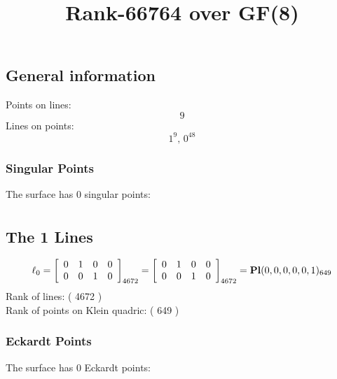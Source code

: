 \documentclass{article}
\newcommand\setTBstruts{\def\T{\rule{0pt}{2.6ex}}%
\def\B{\rule[-1.2ex]{0pt}{0pt}}}
\begin{document}
 
\setTBstruts



{\allowdisplaybreaks%






\title{Rank-66764 over GF(8)}
\author{}%
\maketitle%
%
{}



\subsection*{General information}
Points on lines:
$$
9$$
Lines on points:
$$
1^9,\,0^{48}$$
\subsubsection*{Singular Points}
The surface has 0 singular points:\\
\begin{align*}
\end{align*}
\subsection*{The 1 Lines}
$$
\ell_{0} = 
\left[
\begin{array}{*{4}{r}}
0 & 1 & 0 & 0\\
0 & 0 & 1 & 0\\
\end{array}
\right]
_{4672}
=
\left[
\begin{array}{*{4}c}
0  & 1  & 0  & 0\\
0  & 0  & 1  & 0\\
\end{array}
\right]_{4672}
={\rm\bf Pl}(0,0,0,0,0,1 )_{649}$$
Rank of lines: ( 4672 )\\
Rank of points on Klein quadric: ( 649 )\\
\subsubsection*{Eckardt Points}
The surface has 0 Eckardt points:\\
}
\end{document}
